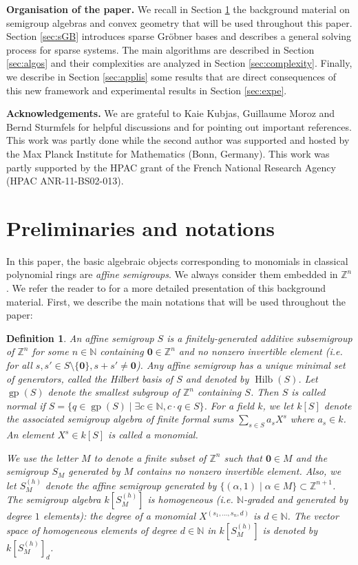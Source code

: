 \documentclass[12pt]{article}
\numberwithin{equation}{section}
\numberwithin{theorem}{section}
\newtheorem{definition}[theorem]{Definition}
\newcommand{\Z}{\mathbb{Z}}
\DeclareMathOperator{\gp}{gp}
\DeclareMathOperator{\hilbert}{Hilb}
\newcommand{\sgp}{S}
\newcommand{\N}{\mathbb{N}}
\begin{document}
 {\bf Organisation of the paper.}  We recall in Section \ref{sec:background}
the background material on semigroup algebras and convex geometry that
will be used throughout this paper. Section \ref{sec:sGB} introduces sparse Gr\"obner bases and describes a
general solving process for sparse systems. The main algorithms
are described in Section \ref{sec:algos} and their complexities are analyzed in
Section \ref{sec:complexity}. Finally, we describe in Section \ref{sec:applis} some results
that are direct consequences of this new framework and experimental results in Section \ref{sec:expe}.  

 {\bf Acknowledgements.} We are grateful to Kaie Kubjas,
Guillaume Moroz and Bernd Sturmfels for helpful discussions and for
pointing out important references. This work was partly done while the
second author was supported and hosted by the Max Planck Institute for
Mathematics (Bonn, Germany). This work was partly supported by the HPAC grant of the French National Research Agency (HPAC ANR-11-BS02-013).

\section{Preliminaries and notations}\label{sec:background}
In this paper, the basic algebraic objects corresponding to monomials
in classical polynomial rings are \emph{affine semigroups}. We always
consider them embedded in $\Z^n$. We refer the reader to
\cite{MilStu05,CoxLitSch11,fulton1993introduction} for a more detailed
presentation of this background material.  First, we describe the main
notations that will be used throughout the paper:
\begin{definition}\label{def:affinesgp}
  An \emph{affine semigroup} $\sgp$ is a finitely-gene\-ra\-ted additive subsemigroup of
  $\Z^n$ for some $n\in\N$ containing $\mathbf 0\in\Z^n$ and no
  nonzero invertible element (\emph{i.e.} for all $s,s'\in\sgp\setminus\{\mathbf 0\}, s+s'\ne
  \mathbf 0$). Any affine semigroup has a unique minimal set of
  generators, called the \emph{Hilbert basis} of $\sgp$ and denoted by
  $\hilbert(\sgp)$. Let $\gp(\sgp)$ denote the smallest subgroup of
  $\Z^n$ containing $\sgp$. Then $\sgp$ is called \emph{normal} if
  $\sgp=\{q\in\gp(\sgp)\mid\exists c\in\N, c\cdot q\in \sgp\}$. For a
  field $k$, we let $k[\sgp]$ denote the associated \emph{semigroup
    algebra} of finite formal sums $\sum_{s\in \sgp}a_s X^s$
  where $a_s\in k$. An element $X^s\in k[\sgp]$ is called a
  \emph{monomial}.

  We use the letter $M$ to denote a finite subset of $\Z^n$ such that
  $\mathbf 0\in M$ and the semigroup $\sgp_M$ generated by $M$ contains no nonzero
  invertible element. Also, we let $\sgp_M^{(h)}$ denote the affine
  semigroup generated by $\{(\alpha,1)\mid \alpha\in
  M\}\subset\Z^{n+1}$. The semigroup algebra $k[\sgp_M^{(h)}]$ is
  \emph{homogeneous} (\emph{i.e.} $\N$-graded and generated by degree
  $1$ elements): the degree of a monomial $X^{(s_1,\ldots,s_n,d)}$ is
  $d\in\N$. The vector space of homogeneous elements of degree $d\in\N$ in $k[\sgp_M^{(h)}]$ is denoted by $k[\sgp_M^{(h)}]_d$.
\end{definition}
\end{document}
